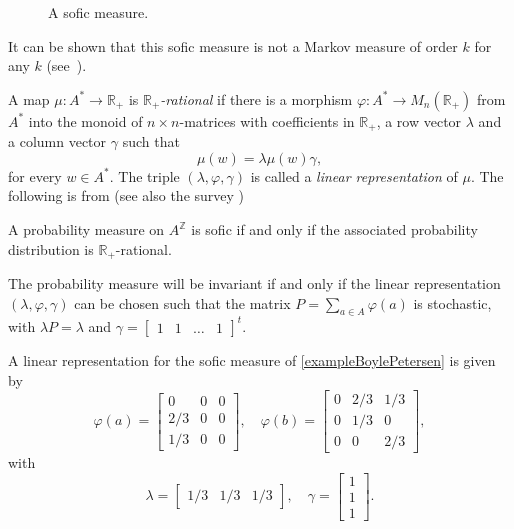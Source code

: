 \documentclass[a4paper,UKenglish,numberwithinsect,cleveref]{lipics-v2021}
\newcommand{\Z}{\mathbb{Z}}
\newcommand{\R}{\mathbb{R}}
\begin{document}
\begin{example}
\begin{figure}
        \caption{A sofic measure.}\label{figureExample}
    \end{figure}
    It can be shown that this sofic measure is not a Markov measure of order $k$ for any $k$ (see~\cite{BoylePetersen2011}).
\end{example}

A map $\mu\colon A^*\to \R_+$ is \emph{$\R_+$-rational} if there is a morphism $\varphi\colon A^*\to M_n(\R_+)$
from $A^*$ into the monoid of $n\times n$-matrices with coefficients in $\R_+$, a row vector $\lambda$
and a column vector $\gamma$ such that
\[
    \mu(w)=\lambda\mu(w)\gamma,
\]
for every $w\in A^*$. The triple $(\lambda,\varphi,\gamma)$ is called a \emph{linear representation} of $\mu$.
The following is from \cite{Hansel1989} (see also the survey \cite{BoylePetersen2011})

\begin{proposition}\label{propositionHP}
    A probability measure on $A^\Z$ is sofic if and only if the associated probability distribution is $\R_+$-rational.
\end{proposition}

The probability measure will be invariant if and only if the linear representation $(\lambda,\varphi,\gamma)$ can be chosen such that the matrix $P=\sum_{a\in A}\varphi(a)$ is stochastic, with $\lambda P=\lambda$ and $\gamma=\begin{bmatrix}1&1&\ldots&1\end{bmatrix}^t$.
\begin{example}
    A linear representation for the sofic measure of \cref{exampleBoylePetersen} is given by 
    \[
        \varphi(a)=\begin{bmatrix}0&0&0\\2/3&0&0\\1/3&0&0\end{bmatrix},\quad
        \varphi(b)=\begin{bmatrix}0&2/3&1/3\\0&1/3&0\\0&0&2/3\end{bmatrix},
    \]
    with 
    \[
        \lambda=\begin{bmatrix}1/3&1/3&1/3\end{bmatrix},\quad \gamma=\begin{bmatrix}1\\ 1\\ 1\end{bmatrix}.
    \]
\end{example}
\end{document}
